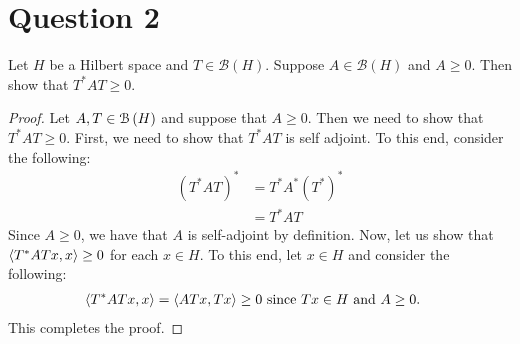 \section{Question 2}
\horz 

Let $H$ be a Hilbert space and $T\in \mathcal B(H).$ Suppose $A\in \mathcal B(H)$ and $A \geqslant 0.$ Then show that $T^* AT \geqslant 0.$

\horz

\begin{proof}
    Let $A , T\in {\cal B} \left( H \right)$ and suppose that $A \ge 0$. Then we need to show that $T^{*} A T \ge 0$. First, we need to show that $T^{*} A T$ is self adjoint. To this end, consider the following:
    \begin{align*}
	\left( T^{*} A T \right)^{*} &= T^{*} A^{*} (T^{*})^{*} \\
	&=  T^{*} A T
    \end{align*}
    Since $A \ge 0$, we have that $A$ is self-adjoint by definition. Now, let us show that $\left\langle T^{*}ATx, x \right\rangle \ge 0 $ for each $x\in H$. To this end, let $x \in H$ and consider the following:
    \begin{align*}
	\left\langle T^{*}AT x, x \right\rangle &= \left\langle ATx , Tx \right\rangle  \ge 0 \text{ since } Tx \in H \text{ and } A\ge 0.
    \end{align*}
    This completes the proof.
\end{proof}
